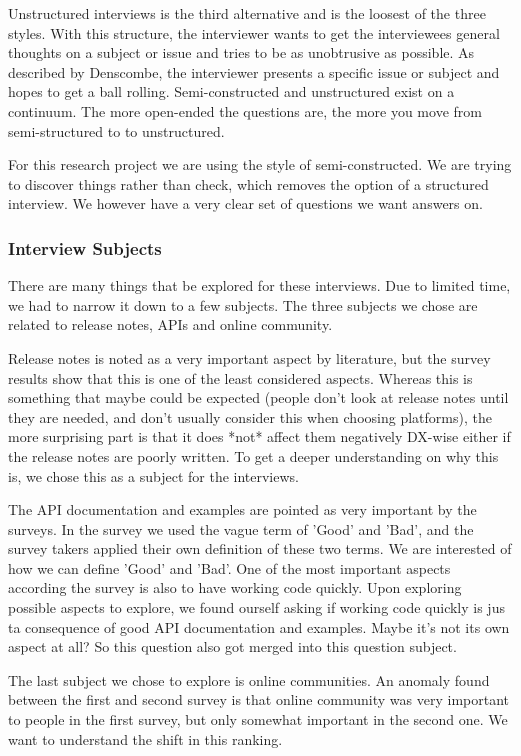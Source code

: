 \documentclass{article}
\begin{document}
Unstructured interviews is the third alternative and is the loosest of the three styles.
With this structure, the interviewer wants to get the interviewees general thoughts
on a subject or issue and tries to be as unobtrusive as possible. As described by Denscombe,
the interviewer presents a specific issue or subject and hopes to get a ball rolling.
Semi-constructed and unstructured exist on a continuum. The more open-ended the questions
are, the more you move from semi-structured to to unstructured.

For this research project we are using the style of semi-constructed.
We are trying to discover things rather than check, which removes the option
of a structured interview. We however have a very clear set of questions
we want answers on.

\subsubsection{Interview Subjects}
There are many things that be explored for these interviews. Due to limited
time, we had to narrow it down to a few subjects. The three subjects
we chose are related to release notes, APIs and online community.

Release notes is noted as a very important aspect by literature, but
the survey results show that this is one of the least considered aspects.
Whereas this is something that maybe could be expected (people don't look
at release notes until they are needed, and don't usually consider this
when choosing platforms), the more surprising part is that it does *not*
affect them negatively DX-wise either if the release notes are poorly written.
To get a deeper understanding on why this is, we chose this as a subject
for the interviews.

The API documentation and examples are pointed as very important by the
surveys. In the survey we used the vague term of 'Good' and 'Bad', and
the survey takers applied their own definition of these two terms. We
are interested of how we can define 'Good' and 'Bad'. One of the most important
aspects according the survey is also to have working code quickly. Upon exploring
possible aspects to explore, we found ourself asking if working code quickly
is jus ta consequence of good API documentation and examples. Maybe it's not
its own aspect at all? So this question also got merged into this question subject.

The last subject we chose to explore is online communities. An anomaly found
between the first and second survey is that online community was very important
to people in the first survey, but only somewhat important in the second one.
We want to understand the shift in this ranking.
\end{document}
